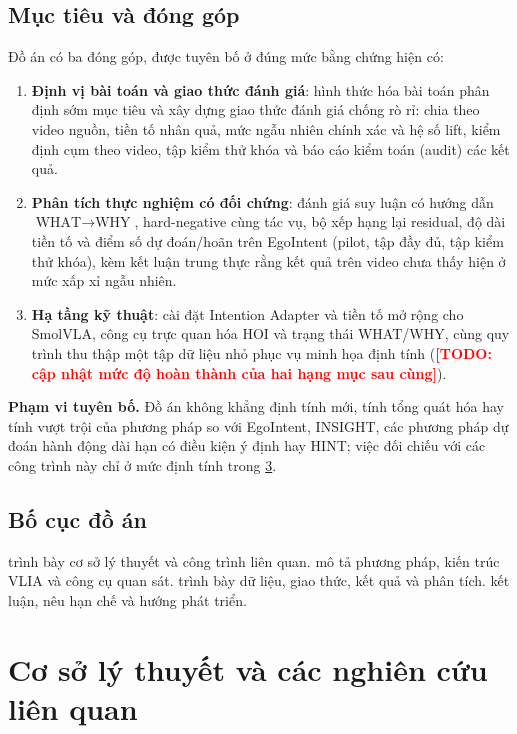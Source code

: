 \documentclass[12pt,a4paper]{report}
\newcommand{\TODO}[1]{\textcolor{red}{\textbf{[TODO: #1]}}}
\begin{document}
\section{Mục tiêu và đóng góp}

Đồ án có ba đóng góp, được tuyên bố ở đúng mức bằng chứng hiện có:
\begin{enumerate}
    \item \textbf{Định vị bài toán và giao thức đánh giá}: hình thức hóa bài toán phân định sớm mục tiêu và xây dựng giao thức đánh giá chống rò rỉ: chia theo video nguồn, tiền tố nhân quả, mức ngẫu nhiên chính xác và hệ số lift, kiểm định cụm theo video, tập kiểm thử khóa và báo cáo kiểm toán (audit) các kết quả.
    \item \textbf{Phân tích thực nghiệm có đối chứng}: đánh giá suy luận có hướng dẫn $\text{WHAT}\to\text{WHY}$, hard-negative cùng tác vụ, bộ xếp hạng lại residual, độ dài tiền tố và điểm số dự đoán/hoãn trên EgoIntent (pilot, tập đầy đủ, tập kiểm thử khóa), kèm kết luận trung thực rằng kết quả trên video chưa thấy hiện ở mức xấp xỉ ngẫu nhiên.
    \item \textbf{Hạ tầng kỹ thuật}: cài đặt Intention Adapter và tiền tố mở rộng cho SmolVLA, công cụ trực quan hóa HOI và trạng thái WHAT/WHY, cùng quy trình thu thập một tập dữ liệu nhỏ phục vụ minh họa định tính (\TODO{cập nhật mức độ hoàn thành của hai hạng mục sau cùng}).
\end{enumerate}

\textbf{Phạm vi tuyên bố.} Đồ án không khẳng định tính mới, tính tổng quát hóa hay tính vượt trội của phương pháp so với EgoIntent, INSIGHT, các phương pháp dự đoán hành động dài hạn có điều kiện ý định hay HINT; việc đối chiếu với các công trình này chỉ ở mức định tính trong \cref{chap:related_work}.

\section{Bố cục đồ án}

 trình bày cơ sở lý thuyết và công trình liên quan.  mô tả phương pháp, kiến trúc VLIA và công cụ quan sát.  trình bày dữ liệu, giao thức, kết quả và phân tích.  kết luận, nêu hạn chế và hướng phát triển.

\chapter{Cơ sở lý thuyết và các nghiên cứu liên quan}
\label{chap:related_work}
\end{document}
